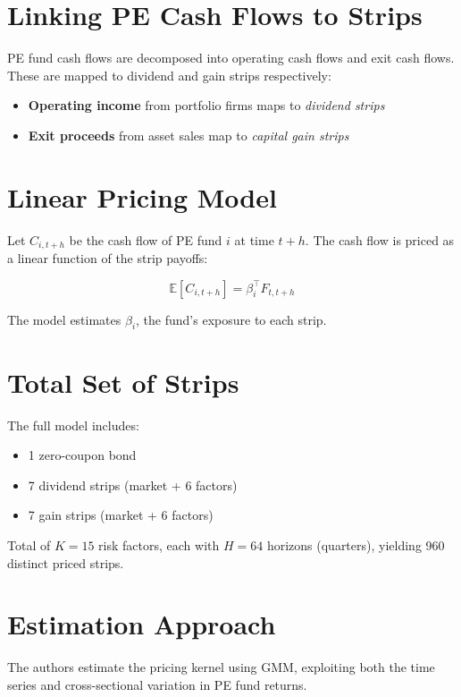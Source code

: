 \documentclass[12pt]{article}
\begin{document}
\section{Linking PE Cash Flows to Strips}
PE fund cash flows are decomposed into operating cash flows and exit cash flows. These are mapped to dividend and gain strips respectively:

\begin{itemize}
    \item \textbf{Operating income} from portfolio firms maps to \textit{dividend strips}
    \item \textbf{Exit proceeds} from asset sales map to \textit{capital gain strips}
\end{itemize}

\section{Linear Pricing Model}
Let $C_{i,t+h}$ be the cash flow of PE fund $i$ at time $t+h$. The cash flow is priced as a linear function of the strip payoffs:

\begin{equation}
\mathbb{E}[C_{i,t+h}] = \beta_i^\top F_{t,t+h}
\end{equation}

The model estimates $\beta_i$, the fund’s exposure to each strip.

\section{Total Set of Strips}
The full model includes:

\begin{itemize}
    \item 1 zero-coupon bond
    \item 7 dividend strips (market + 6 factors)
    \item 7 gain strips (market + 6 factors)
\end{itemize}

Total of $K = 15$ risk factors, each with $H = 64$ horizons (quarters), yielding 960 distinct priced strips.

\section{Estimation Approach}
The authors estimate the pricing kernel using GMM, exploiting both the time series and cross-sectional variation in PE fund returns.
\end{document}

